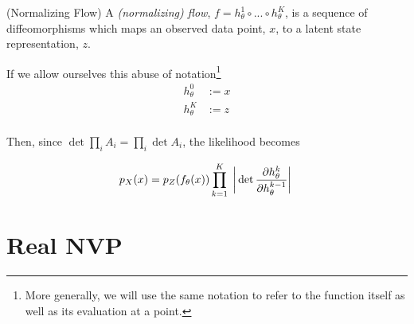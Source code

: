 \documentclass[10pt]{beamer}
\begin{document}
\begin{frame}
\begin{definition}{(Normalizing Flow)} \label{flow}
A \textit{(normalizing) flow}, $f=h_\theta^1 \circ ... \circ h_\theta^K$, is a sequence of diffeomorphisms which maps an observed data point, $x$, to a latent state representation, $z$. 
\end{definition}

\pause
If we allow ourselves this abuse of notation\footnote{More generally, we will use the same notation to refer to the function itself as well as its evaluation at a point.}
\begin{align*}
h_\theta^0 &:=x \\
h_\theta^K &:= z \\
\end{align*}

Then, since $\det \prod_i A_i = \prod_i \det A_i$, the likelihood becomes 

\begin{equation} 
\label{cov}
p_X(x) = p_Z( f_\theta(x) ) \displaystyle\prod_{k=1}^K\; \bigg\lvert \det{\displaystyle\frac{\partial h_\theta^k}{\partial h_\theta^{k-1}}} \bigg\rvert \;  
\end{equation}
\end{frame}

%
%



\section{Real NVP}
\end{document}
